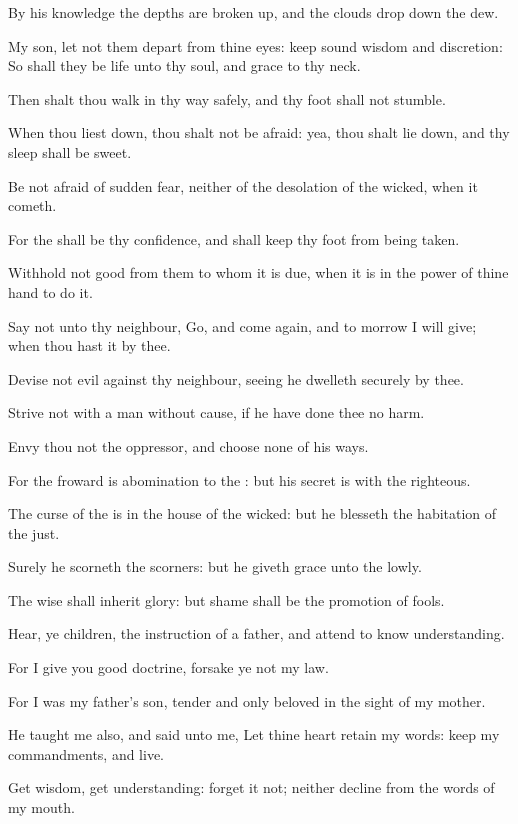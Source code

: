 \Verse By his knowledge the depths are broken up, and the clouds drop down the dew.

\Verse My son, let not them depart from thine eyes: keep sound wisdom and discretion: \Verse So shall they be life unto thy soul, and grace to thy neck.

\Verse Then shalt thou walk in thy way safely, and thy foot shall not stumble.

\Verse When thou liest down, thou shalt not be afraid: yea, thou shalt lie down, and thy sleep shall be sweet.

\Verse Be not afraid of sudden fear, neither of the desolation of the wicked, when it cometh.

\Verse For the \LORD shall be thy confidence, and shall keep thy foot from being taken.

\Verse Withhold not good from them to whom it is due, when it is in the power of thine hand to do it.

\Verse Say not unto thy neighbour, Go, and come again, and to morrow I will give; when thou hast it by thee.

\Verse Devise not evil against thy neighbour, seeing he dwelleth securely by thee.

\Verse Strive not with a man without cause, if he have done thee no harm.

\Verse Envy thou not the oppressor, and choose none of his ways.

\Verse For the froward is abomination to the \LORD: but his secret is with the righteous.

\Verse The curse of the \LORD is in the house of the wicked: but he blesseth the habitation of the just.

\Verse Surely he scorneth the scorners: but he giveth grace unto the lowly.

\Verse The wise shall inherit glory: but shame shall be the promotion of fools.


\Chapter
\Verse Hear, ye children, the instruction of a father, and attend to know understanding.

\Verse For I give you good doctrine, forsake ye not my law.

\Verse For I was my father's son, tender and only beloved in the sight of my mother.

\Verse He taught me also, and said unto me, Let thine heart retain my words: keep my commandments, and live.

\Verse Get wisdom, get understanding: forget it not; neither decline from the words of my mouth.

